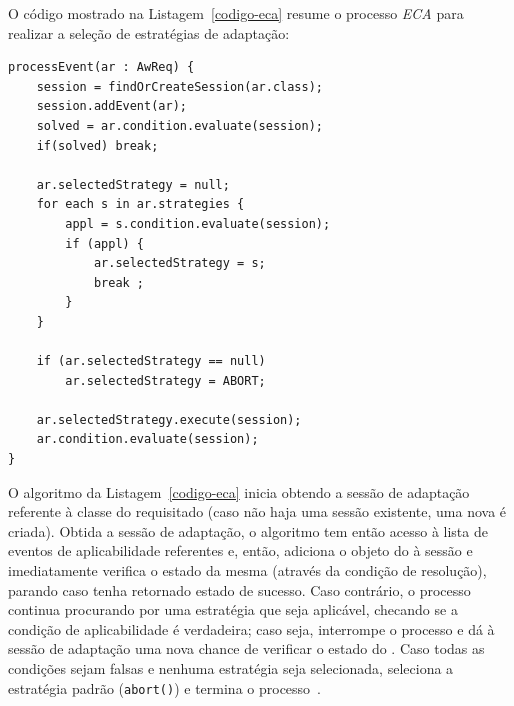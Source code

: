 O código mostrado na Listagem~\ref{codigo-eca} resume o processo \textit{ECA} para realizar a seleção de estratégias de adaptação:

\begin{lstlisting}[caption={Código do processo ECA},label={codigo-eca}]
processEvent(ar : AwReq) {
	session = findOrCreateSession(ar.class);
	session.addEvent(ar);
	solved = ar.condition.evaluate(session);
	if(solved) break;

	ar.selectedStrategy = null;
	for each s in ar.strategies {
		appl = s.condition.evaluate(session);
		if (appl) {
			ar.selectedStrategy = s;
			break ;
		}
	}

	if (ar.selectedStrategy == null)
		ar.selectedStrategy = ABORT;

	ar.selectedStrategy.execute(session);
	ar.condition.evaluate(session);
}
\end{lstlisting}

O algoritmo da Listagem~\ref{codigo-eca} inicia obtendo a sessão de adaptação referente à classe do \awreq requisitado (caso não haja uma sessão existente, uma nova é criada). Obtida a sessão de adaptação, o algoritmo tem então acesso à lista de eventos de aplicabilidade referentes e, então, adiciona o objeto do \awreq à sessão e imediatamente verifica o estado da mesma (através da condição de resolução), parando caso tenha retornado estado de sucesso. Caso contrário, o processo continua procurando por uma estratégia que seja aplicável, checando se a condição de aplicabilidade é verdadeira; caso seja, interrompe o processo e dá à sessão de adaptação uma nova chance de verificar o estado do \awreq. Caso todas as condições sejam falsas e nenhuma estratégia seja selecionada, seleciona a estratégia padrão (\texttt{abort()}) e termina o processo~\cite{tesevitor}. 

